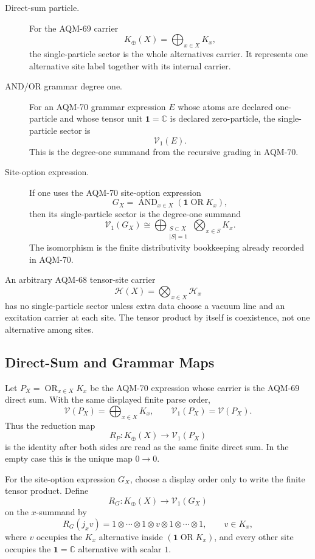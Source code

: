 \begin{description}
\item[Direct-sum particle.]
For the AQM-69 carrier
\[
  K_{\oplus}(X)=\bigoplus_{x\in X}K_x ,
\]
the single-particle sector is the whole alternatives carrier.  It represents
one alternative site label together with its internal carrier.

\item[AND/OR grammar degree one.]
For an AQM-70 grammar expression \(E\) whose atoms are declared
one-particle and whose tensor unit \(\mathbf 1=\mathbb C\) is declared
zero-particle, the single-particle sector is
\[
  \mathcal V_1(E).
\]
This is the degree-one summand from the recursive grading in AQM-70.

\item[Site-option expression.]
If one uses the AQM-70 site-option expression
\[
  G_X=\operatorname{AND}_{x\in X}(\mathbf 1\operatorname{OR}K_x),
\]
then its single-particle sector is the degree-one summand
\[
  \mathcal V_1(G_X)
  \cong
  \bigoplus_{\substack{S\subset X\\ |S|=1}}
  \bigotimes_{x\in S}K_x .
\]
The isomorphism is the finite distributivity bookkeeping already recorded in
AQM-70.
\end{description}

An arbitrary AQM-68 tensor-site carrier
\[
  \mathcal H(X)=\bigotimes_{x\in X}\mathcal H_x
\]
has no single-particle sector unless extra data choose a vacuum line and an
excitation carrier at each site.  The tensor product by itself is
coexistence, not one alternative among sites.

\subsection{Direct-Sum and Grammar Maps}

Let \(P_X=\operatorname{OR}_{x\in X}K_x\) be the AQM-70 expression whose
carrier is the AQM-69 direct sum.  With the same displayed finite parse order,
\[
  \mathcal V(P_X)=\bigoplus_{x\in X}K_x,\qquad
  \mathcal V_1(P_X)=\mathcal V(P_X).
\]
Thus the reduction map
\[
  R_P:K_{\oplus}(X)\longrightarrow \mathcal V_1(P_X)
\]
is the identity after both sides are read as the same finite direct sum.  In
the empty case this is the unique map \(0\to0\).

For the site-option expression \(G_X\), choose a display order only to write
the finite tensor product.  Define
\[
  R_G:K_{\oplus}(X)\longrightarrow \mathcal V_1(G_X)
\]
on the \(x\)-summand by
\[
  R_G(j_x v)
  =
  1\otimes\cdots\otimes 1\otimes v\otimes 1\otimes\cdots\otimes 1,
  \qquad v\in K_x,
\]
where \(v\) occupies the \(K_x\) alternative inside
\((\mathbf 1\operatorname{OR}K_x)\), and every other site occupies the
\(\mathbf 1=\mathbb C\) alternative with scalar \(1\).

